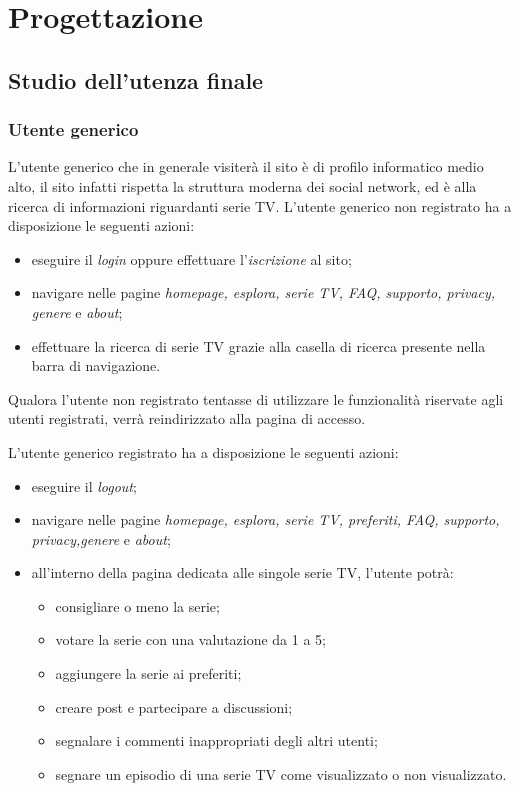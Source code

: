 \newpage
\section{Progettazione}
\subsection{Studio dell'utenza finale}
\subsubsection{Utente generico}
L'utente generico che in generale visiterà il sito è di profilo informatico medio alto, il sito infatti rispetta la struttura moderna dei social network, ed è alla ricerca di informazioni riguardanti serie TV.
L'utente generico non registrato ha a disposizione le seguenti azioni:
\begin{itemize}
	\item eseguire il \textit{login} oppure effettuare l'\textit{iscrizione} al sito;
	\item navigare nelle pagine \textit{homepage, esplora, serie TV, FAQ, supporto, privacy, genere} e \textit{about};
	\item effettuare la ricerca di serie TV grazie alla casella di ricerca presente nella barra di navigazione.
\end{itemize}
Qualora l'utente non registrato tentasse di utilizzare le funzionalità riservate agli utenti registrati, verrà reindirizzato alla pagina di accesso.

L'utente generico registrato ha a disposizione le seguenti azioni:
\begin{itemize}
	\item eseguire il \textit{logout};
	\item navigare nelle pagine \textit{homepage, esplora, serie TV, preferiti, FAQ, supporto, privacy,genere} e \textit{about};
	\item all'interno della pagina dedicata alle singole serie TV, l'utente potrà:
	\begin{itemize}
		\item consigliare o meno la serie;
		\item votare la serie con una valutazione da 1 a 5;
		\item aggiungere la serie ai preferiti; 
		\item creare post e partecipare a discussioni;
		\item segnalare i commenti inappropriati degli altri utenti;
		\item segnare un episodio di una serie TV come visualizzato o non visualizzato.
	\end{itemize}
\end{itemize}


